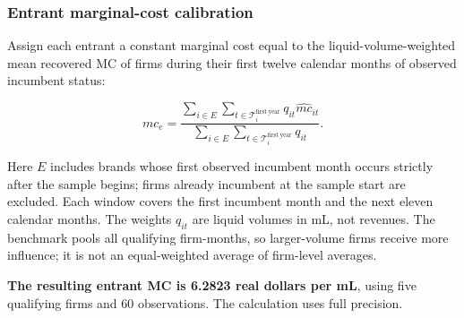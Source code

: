 \documentclass[10pt,]{article}
\begin{document}
\subsubsection{Entrant marginal-cost
calibration}\label{entrant-marginal-cost-calibration}

Assign each entrant a constant marginal cost equal to the
liquid-volume-weighted mean recovered MC of firms during their first
twelve calendar months of observed incumbent status:

\[
mc_e=\frac{\sum_{i\in E}\sum_{t\in\mathcal{T}_i^{\mathrm{first\ year}}}q_{it}\widehat{mc}_{it}}
{\sum_{i\in E}\sum_{t\in\mathcal{T}_i^{\mathrm{first\ year}}}q_{it}}.
\]

Here \(E\) includes brands whose first observed incumbent month occurs
strictly after the sample begins; firms already incumbent at the sample
start are excluded. Each window covers the first incumbent month and the
next eleven calendar months. The weights \(q_{it}\) are liquid volumes
in mL, not revenues. The benchmark pools all qualifying firm-months, so
larger-volume firms receive more influence; it is not an equal-weighted
average of firm-level averages.

\textbf{The resulting entrant MC is 6.2823 real dollars per mL}, using
five qualifying firms and 60 observations. The calculation uses full
precision.
\end{document}
